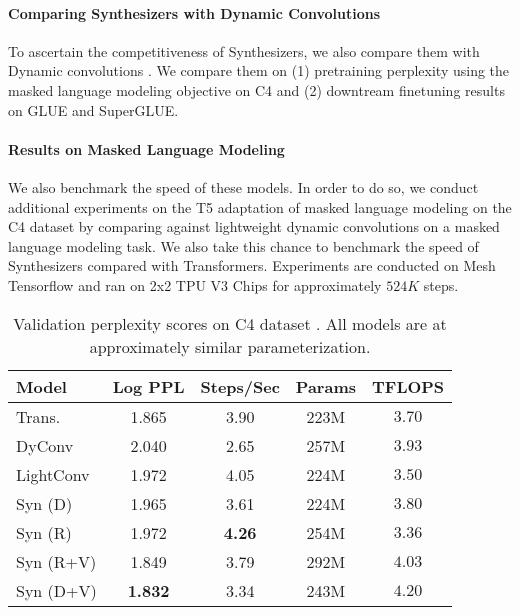 \documentclass{article}
\begin{document}
 









\paragraph{Comparing Synthesizers with Dynamic Convolutions}
To ascertain the competitiveness of Synthesizers, we also compare them with Dynamic convolutions \citep{wu2019pay}. We compare them on (1) pretraining perplexity using the masked language modeling objective on C4 and (2) downtream finetuning results on GLUE and SuperGLUE.

\paragraph{Results on Masked Language Modeling}
We also benchmark the speed of these models. In order to do so, we conduct additional experiments on the T5 adaptation of masked language modeling on the C4 dataset \citep{raffel2019exploring} by comparing against lightweight dynamic convolutions \citep{wu2019pay} on a masked language modeling task. We also take this chance to benchmark the speed of Synthesizers compared with Transformers. Experiments are conducted on Mesh Tensorflow \citep{shazeer2018mesh} and ran on 2x2 TPU V3 Chips for approximately $524K$ steps.
\begin{table}[]
    \centering
    \small
    \begin{tabular}{l|cccc}
    \toprule
       Model  &  Log PPL & Steps/Sec & Params & TFLOPS\\
       \midrule
        Trans. & 1.865 & 3.90 & 223M & $3.70$\\ 
DyConv  & 2.040 & 2.65 & 257M & $3.93$\\ 
        LightConv & 1.972 & 4.05 & 224M & $3.50$ \\ \hline
        Syn (D) & 1.965 & 3.61 & 224M  & $3.80$\\ 
        Syn (R) & 1.972 & \textbf{4.26} & 254M & $3.36$ \\ 
        Syn (R+V) & 1.849 & 3.79 & 292M & $4.03$\\
        Syn (D+V) & \textbf{1.832} & 3.34 & 243M & $4.20$\\ 
        \bottomrule
    \end{tabular}
    \caption{Validation perplexity scores on C4 dataset \citep{raffel2019exploring}. All models are at approximately similar parameterization.}
    \label{tab:ppl}
\end{table}
\end{document}
